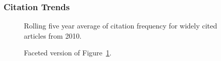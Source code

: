 \documentclass[
  10pt,
  letterpaper,
  DIV=11,
  numbers=noendperiod,
  twoside]{scrartcl}
\begin{document}
\subsubsection*{Citation Trends}\label{sec-trends-2010}

\begin{figure}


\caption{\label{fig-citation-spaghetti-2010}Rolling five year average of
citation frequency for widely cited articles from 2010.}

\end{figure}%

\begin{figure}


\caption{\label{fig-citation-facet-2010}Faceted version of
Figure~\ref{fig-citation-spaghetti-2010}.}

\end{figure}%
\end{document}
